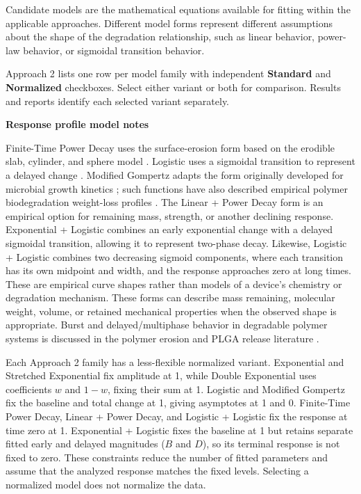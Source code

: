 Candidate models are the mathematical equations available for fitting within the applicable approaches. Different model forms represent different assumptions about the shape of the degradation relationship, such as linear behavior, power-law behavior, or sigmoidal transition behavior.



Approach 2 lists one row per model family with independent \textbf{Standard} and \textbf{Normalized} checkboxes. Select either variant or both for comparison. Results and reports identify each selected variant separately.

\textbf{Response profile model notes}

Finite-Time Power Decay uses the surface-erosion form based on the erodible slab, cylinder, and sphere model \cite{hopfenberg1976}. Logistic uses a sigmoidal transition to represent a delayed change \cite{tsoularis2002}. Modified Gompertz adapts the form originally developed for microbial growth kinetics \cite{zwietering1990}; such functions have also described empirical polymer biodegradation weight-loss profiles \cite{dragomir2021}. The Linear + Power Decay form is an empirical option for remaining mass, strength, or another declining response. Exponential + Logistic combines an early exponential change with a delayed sigmoidal transition, allowing it to represent two-phase decay. Likewise, Logistic + Logistic combines two decreasing sigmoid components, where each transition has its own midpoint and width, and the response approaches zero at long times.  These are empirical curve shapes rather than models of a device's chemistry or degradation mechanism. These forms can describe mass remaining, molecular weight, volume, or retained mechanical properties when the observed shape is appropriate. Burst and delayed/multiphase behavior in degradable polymer systems is discussed in the polymer erosion and PLGA release literature \cite{gopferich1997,fredenberg2011,allison2008}. 

Each Approach 2 family has a less-flexible normalized variant. Exponential and Stretched Exponential fix amplitude at 1, while Double Exponential uses coefficients $w$ and $1-w$, fixing their sum at 1. Logistic and Modified Gompertz fix the baseline and total change at 1, giving asymptotes at 1 and 0. Finite-Time Power Decay, Linear + Power Decay, and Logistic + Logistic fix the response at time zero at 1. Exponential + Logistic fixes the baseline at 1 but retains separate fitted early and delayed magnitudes ($B$ and $D$), so its terminal response is not fixed to zero. These constraints reduce the number of fitted parameters and assume that the analyzed response matches the fixed levels. Selecting a normalized model does not normalize the data.


